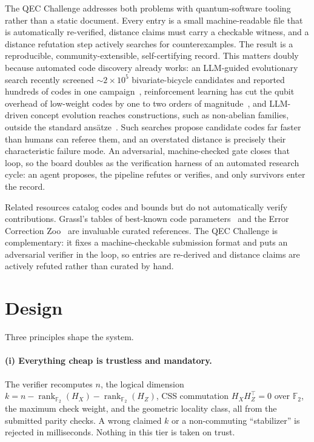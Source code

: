 \documentclass[11pt]{article}
\newcommand{\GF}{\mathbb{F}_2}
\newcommand{\rank}{\operatorname{rank}}
\begin{document}
The QEC Challenge addresses both problems with quantum-software tooling rather
than a static document. Every entry is a small machine-readable file that is
automatically re-verified, distance claims must carry a checkable witness, and a
distance refutation step actively searches for counterexamples. The result is a
reproducible, community-extensible, self-certifying record. This matters doubly
because automated code discovery already works: an LLM-guided evolutionary
search recently screened ${\sim}2\times10^{5}$ bivariate-bicycle candidates and
reported hundreds of codes in one campaign~\cite{cruzbenito2026evolutionary},
reinforcement learning has cut the qubit overhead of low-weight codes by one to
two orders of magnitude~\cite{he2025reinforcement}, and LLM-driven concept
evolution reaches constructions, such as non-abelian families, outside the
standard ans{\"a}tze~\cite{liu2026concept}. Such searches propose candidate
codes far faster than humans can referee them, and an overstated distance is
precisely their characteristic failure mode. An adversarial, machine-checked
gate closes that loop, so the board doubles as the verification harness of an
automated research cycle: an agent proposes, the pipeline refutes or verifies,
and only survivors enter the record.

Related resources catalog codes and bounds but do not automatically verify
contributions. Grassl's tables of best-known code
parameters~\cite{grassl2007codetables} and the Error Correction
Zoo~\cite{albert2026zoo} are invaluable curated references. The QEC Challenge is
complementary: it fixes a machine-checkable submission format and puts an
adversarial verifier in the loop, so entries are re-derived and distance claims
are actively refuted rather than curated by hand.

\section{Design}

Three principles shape the system.

\paragraph{(i) Everything cheap is trustless and mandatory.} The verifier
recomputes $n$, the logical dimension
$k = n - \rank_{\GF}(H_X) - \rank_{\GF}(H_Z)$, CSS commutation
$H_X H_Z^{\top} = 0$ over $\GF$, the maximum check weight, and the geometric
locality class, all from the submitted parity checks. A wrong claimed $k$ or a
non-commuting ``stabilizer'' is rejected in milliseconds. Nothing in this tier is
taken on trust.
\end{document}
